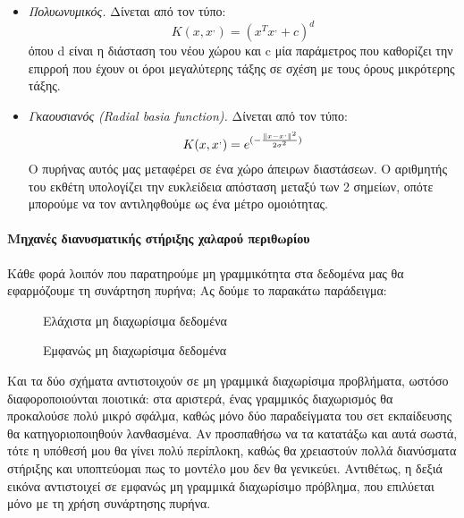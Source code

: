 		\begin{itemize}
			\item \textit{Πολυωνυμικός.} Δίνεται από τον τύπο:
			\begin{equation}
			K(x, x^,)= (x^T x^, + c)^d
			\end{equation}
			όπου d είναι η διάσταση του νέου χώρου και c μία παράμετρος που καθορίζει την επιρροή που έχουν οι όροι μεγαλύτερης τάξης σε σχέση με τους όρους μικρότερης τάξης.
			\item \textit{Γκαουσιανός (Radial basia function).} Δίνεται από τον τύπο:
		\begin{equation}
		K(x, x^,)= e^{(-\frac{\left\lVert x-x^,\right\rVert^2}{2 \sigma ^2})}
		\end{equation}
			Ο πυρήνας αυτός μας μεταφέρει σε ένα χώρο άπειρων διαστάσεων. Ο αριθμητής του εκθέτη υπολογίζει την ευκλείδεια απόσταση μεταξύ των 2 σημείων, οπότε μπορούμε να τον αντιληφθούμε ως ένα μέτρο ομοιότητας.
		\end{itemize}
		\paragraph{Μηχανές διανυσματικής στήριξης χαλαρού περιθωρίου}Κάθε φορά λοιπόν που παρατηρούμε μη γραμμικότητα στα δεδομένα μας θα εφαρμόζουμε τη συνάρτηση
		πυρήνα; Ας δούμε το παρακάτω παράδειγμα:
		\begin{figure}[H]
			\centering
			\begin{minipage}{.5\textwidth}
				\centering
				\caption[Ελάχιστα μη διαχωρίσιμα δεδομένα]{Ελάχιστα μη διαχωρίσιμα δεδομένα}				
			\end{minipage}%
			\begin{minipage}{0.5\textwidth}
				\centering
				\caption[Εμφανώς μη διαχωρίσιμα δεδομένα]{Εμφανώς μη διαχωρίσιμα δεδομένα}				
			\end{minipage}
		\end{figure}
		Και τα δύο σχήματα αντιστοιχούν σε μη γραμμικά διαχωρίσιμα προβλήματα, ωστόσο
		διαφοροποιούνται ποιοτικά: στα αριστερά, ένας γραμμικός διαχωρισμός θα προκαλούσε πολύ μικρό σφάλμα, καθώς μόνο δύο παραδείγματα του σετ εκπαίδευσης θα κατηγοριοποιηθούν λανθασμένα. Αν προσπαθήσω να τα κατατάξω και αυτά σωστά, τότε η υπόθεσή μου θα γίνει πολύ περίπλοκη, καθώς θα χρειαστούν πολλά διανύσματα στήριξης και υποπτεύομαι πως το μοντέλο μου δεν θα γενικεύει. Αντιθέτως, η δεξιά εικόνα αντιστοιχεί σε εμφανώς μη γραμμικά διαχωρίσιμο πρόβλημα, που επιλύεται μόνο με τη χρήση συνάρτησης πυρήνα.
		
